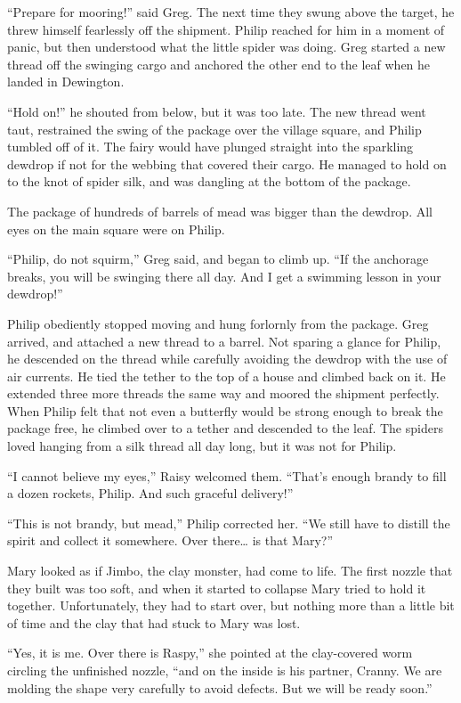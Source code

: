\documentclass[10pt, draft]{memoir}
\begin{document}
``Prepare for mooring!'' said Greg. The next time they swung above the target,
he threw himself fearlessly off the shipment. Philip reached for him in a
moment of panic, but then understood what the little spider was doing. Greg
started a new thread off the swinging cargo and anchored the other end to the
leaf when he landed in Dewington.

``Hold on!'' he shouted from below, but it was too late. The new thread went
taut, restrained the swing of the package over the village square, and Philip
tumbled off of it. The fairy would have plunged straight into the sparkling
dewdrop if not for the webbing that covered their cargo. He managed to hold on
to the knot of spider silk, and was dangling at the bottom of the package.

The package of hundreds of barrels of mead was bigger than the dewdrop. All
eyes on the main square were on Philip.

``Philip, do not squirm,'' Greg said, and began to climb up. ``If the anchorage
breaks, you will be swinging there all day. And I get a swimming lesson in your
dewdrop!''

Philip obediently stopped moving and hung forlornly from the package. Greg
arrived, and attached a new thread to a barrel. Not sparing a glance for
Philip, he descended on the thread while carefully avoiding the dewdrop with
the use of air currents. He tied the tether to the top of a house and climbed
back on it. He extended three more threads the same way and moored the shipment
perfectly. When Philip felt that not even a butterfly would be strong enough to
break the package free, he climbed over to a tether and descended to the leaf.
The spiders loved hanging from a silk thread all day long, but it was not for
Philip.

``I cannot believe my eyes,'' Raisy welcomed them. ``That's enough brandy to
fill a dozen rockets, Philip. And such graceful delivery!''

``This is not brandy, but mead,'' Philip corrected her. ``We still have to
distill the spirit and collect it somewhere. Over there… is that Mary?''

Mary looked as if Jimbo, the clay monster, had come to life. The first nozzle
that they built was too soft, and when it started to collapse Mary tried to
hold it together. Unfortunately, they had to start over, but nothing more than
a little bit of time and the clay that had stuck to Mary was lost.

``Yes, it is me. Over there is Raspy,'' she pointed at the clay-covered worm
circling the unfinished nozzle, ``and on the inside is his partner, Cranny. We
are molding the shape very carefully to avoid defects. But we will be ready
soon.''
\end{document}
